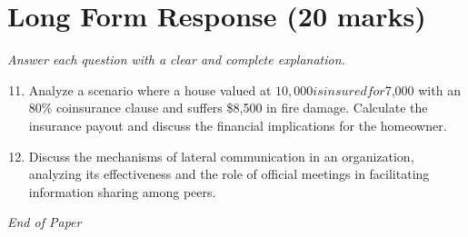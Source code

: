 \documentclass[12pt]{article}
\begin{document}
\section*{Long Form Response (20 marks)}
\textit{Answer each question with a clear and complete explanation.}
\begin{enumerate}[label=\arabic*.]
\setcounter{enumi}{10}
\item Analyze a scenario where a house valued at $10,000 is insured for $7,000 with an 80\% coinsurance clause and suffers \$8,500 in fire damage. Calculate the insurance payout and discuss the financial implications for the homeowner.
\item Discuss the mechanisms of lateral communication in an organization, analyzing its effectiveness and the role of official meetings in facilitating information sharing among peers.
\end{enumerate}

\vfill
\noindent\textit{End of Paper}
\end{document}

